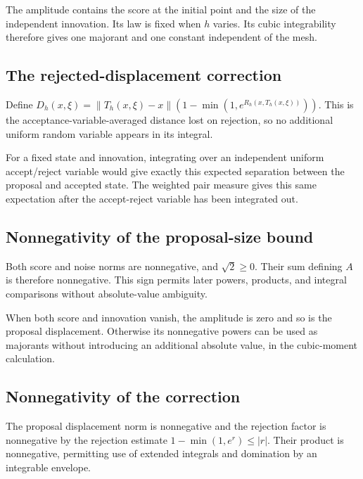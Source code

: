 \documentclass[11pt,a4paper]{report}
\begin{document}
The amplitude contains the score at the initial point and the size of the independent innovation. Its law is fixed when \(h\) varies. Its cubic integrability therefore gives one majorant and one constant independent of the mesh.

\subsection{\texorpdfstring{The rejected-displacement correction}{The rejected-displacement correction}}
\label{report-step-UnadjustedLangevin-MALAError-lean-10}


Define \(D_h(x,\xi)=\|T_h(x,\xi)-x\|(1-\min(1,e^{R_h(x,T_h(x,\xi))}))\). This is the acceptance-variable-averaged distance lost on rejection, so no additional uniform random variable appears in its integral.



For a fixed state and innovation, integrating over an independent uniform accept/\allowbreak{}reject variable would give exactly this expected separation between the proposal and accepted state. The weighted pair measure gives this same expectation after the accept-reject variable has been integrated out.

\subsection{\texorpdfstring{Nonnegativity of the proposal-size bound}{Nonnegativity of the proposal-size bound}}
\label{report-step-UnadjustedLangevin-MALAError-lean-11}


Both score and noise norms are nonnegative, and \(\sqrt2\ge0\). Their sum defining \(A\) is therefore nonnegative. This sign permits later powers, products, and integral comparisons without absolute-value ambiguity.



When both score and innovation vanish, the amplitude is zero and so is the proposal displacement. Otherwise its nonnegative powers can be used as majorants without introducing an additional absolute value, in the cubic-moment calculation.

\subsection{\texorpdfstring{Nonnegativity of the correction}{Nonnegativity of the correction}}
\label{report-step-UnadjustedLangevin-MALAError-lean-12}


The proposal displacement norm is nonnegative and the rejection factor is nonnegative by the rejection estimate \(1-\min(1,e^r)\le|r|\). Their product is nonnegative, permitting use of extended integrals and domination by an integrable envelope.
\end{document}
